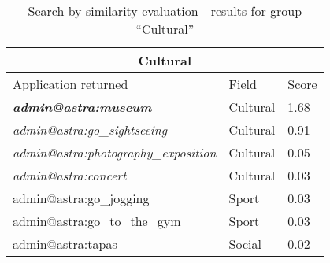 \begin{table}[h!]
	\tiny
    \begin{center}
		\begin{tabular}{||l|l|l||}

		\hline \hline
		\multicolumn{3}{||c||}{\bfseries{Cultural}} \\
		\hline \hline
			Application returned & Field & Score \\
			\hline \hline

			\textit{\textbf{admin@astra:museum}}	&	Cultural	&	1.68	\\
			\hline
			\textit{admin@astra:go\_sightseeing}	&	Cultural	&	0.91	\\
			\hline
			\textit{admin@astra:photography\_exposition}	&	Cultural	&	0.05	\\
			\hline
			\textit{admin@astra:concert}	&	Cultural	&	0.03	\\
			\hline
			admin@astra:go\_jogging	&	Sport	&	0.03	\\
			\hline
			admin@astra:go\_to\_the\_gym	&	Sport	&	0.03	\\
			\hline
			admin@astra:tapas	&	Social	&	0.02	\\


		\hline \hline

		\end{tabular}
		\caption{\label{table:testing-results-cultural}Search by similarity evaluation
		- results for group ``Cultural''}
	\end{center}
\end{table} 

